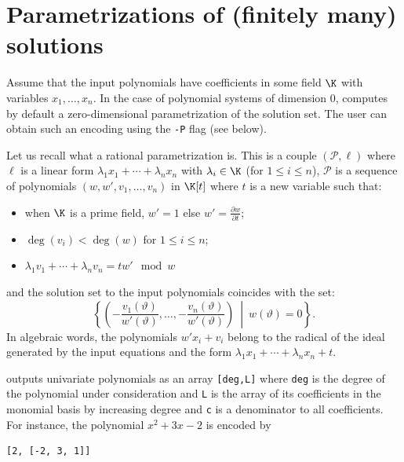 \documentclass[a4paper,english,11pt]{scrartcl}
\theoremstyle{definition}
\theoremstyle{remark}
\newcommand{\st}{\ \middle|\ }
\def\leq{\leqslant}
\begin{document}
\section{Parametrizations of (finitely many) solutions}
\label{sec:param}

Assume that the input polynomials have coefficients in some field $\K$ with
variables $x_1, \ldots, x_n$. In the case of polynomial systems of dimension
$0$, \msolve computes by default a zero-dimensional parametrization of the
solution set. The user can obtain such an encoding using the \verb+-P+ flag
(see below).

Let us recall what a rational parametrization is.
This is a couple $(\mathscr{P}, \ell)$ where $\ell$ is a linear form $\lambda_1
x_1 + \cdots + \lambda_n x_n$ with $\lambda_i\in \K$ (for $1\leq i \leq n$),
$\mathscr{P}$ is a sequence of polynomials $(w, w', v_1, \ldots, v_n)$ in
$\K[t]$ where $t$ is a new variable such that:
\begin{itemize}
\item when $\K$ is a prime field, $w'=1$ else $w' = \frac{\partial w}{\partial
    t}$;
\item $\deg(v_i) < \deg(w)$ for $1\leq i \leq n$;
\item $\lambda_1 v_1 +\cdots +\lambda_n v_n = tw' \mod w$
\end{itemize}
and the solution set to the input polynomials coincides with the set:
\[
\left \{\left (-\frac{v_1(\vartheta)}{w'(\vartheta)}, \ldots,
  -\frac{v_n(\vartheta)}{w'(\vartheta)}\right ) \st w(\vartheta) = 0
\right\}.
\]
In algebraic words, the polynomials \(w' x_i + v_i\) belong to the radical of the
ideal generated by the input equations and the form \(\lambda_1 x_1 + \cdots +
\lambda_n x_n + t\).

\msolve outputs univariate polynomials as an array \verb+[deg,L]+ where
\verb+deg+ is the degree of the polynomial under consideration and \verb+L+ is
the array of its coefficients in the monomial basis by increasing degree and
\verb+c+ is a denominator to all coefficients. For instance, the polynomial
\(x^2+3x-2\) is encoded by
\begin{verbatim}
[2, [-2, 3, 1]]
\end{verbatim}
\end{document}
